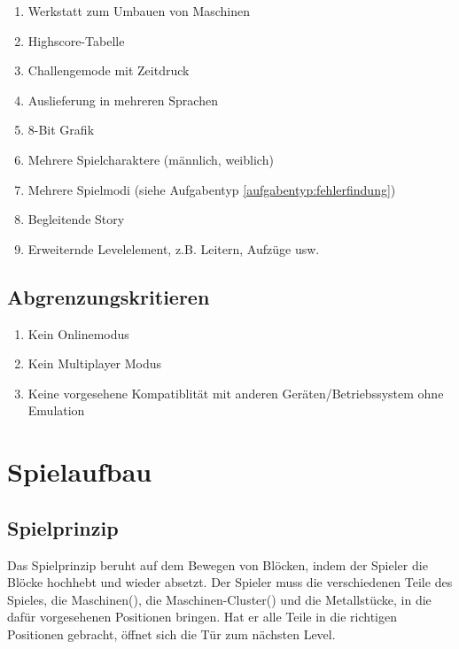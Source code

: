 \documentclass{scrartcl}
\begin{document}
\begin{enumerate}
	\item \label{wunsch:werkstatt}Werkstatt zum Umbauen von Maschinen
	\item \label{wunsch:highscore}Highscore-Tabelle
	\item \label{wunsch:challengemode}Challengemode mit Zeitdruck
	\item \label{wunsch:multilang}Auslieferung in mehreren Sprachen
	\item \label{wunsch:8bit}8-Bit Grafik
	\item \label{wunsch:multiplechar}Mehrere Spielcharaktere (männlich, weiblich)
	\item \label{wunsch:multiplemode}Mehrere Spielmodi (siehe Aufgabentyp \ref{aufgabentyp:fehlerfindung})
    \item \label{wunsch:story} Begleitende Story
    \item \label{wunsch:erweiterndeLevelelemente} Erweiternde Levelelement, z.B. Leitern, Aufzüge usw.
\end{enumerate}

\subsection{Abgrenzungskritieren}

\begin{enumerate}
	\item Kein Onlinemodus
	\item Kein Multiplayer Modus
	\item Keine vorgesehene Kompatiblität mit anderen Geräten/Betriebssystem ohne Emulation
\end{enumerate}

\clearpage

\section{Spielaufbau}

\subsection{Spielprinzip}
Das Spielprinzip beruht auf dem Bewegen von Blöcken, indem der Spieler die Blöcke hochhebt und wieder absetzt. Der Spieler muss die verschiedenen Teile des Spieles, die Maschinen(), die Maschinen-Cluster() und die Metallstücke, in die dafür vorgesehenen Positionen bringen. Hat er alle Teile in die richtigen Positionen gebracht, öffnet sich die Tür zum nächsten Level.
\end{document}
